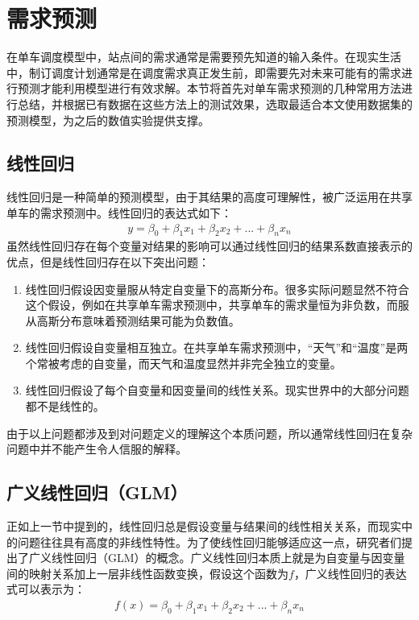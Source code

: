 \documentclass[]{tongjithesis}
\numberwithin{equation}{chapter}
\begin{document}
\clearpage

\chapter{需求预测}
在单车调度模型中，站点间的需求通常是需要预先知道的输入条件。在现实生活中，制订调度计划通常是在调度需求真正发生前，即需要先对未来可能有的需求进行预测才能利用模型进行有效求解。本节将首先对单车需求预测的几种常用方法进行总结，并根据已有数据在这些方法上的测试效果，选取最适合本文使用数据集的预测模型，为之后的数值实验提供支撑。
\section{线性回归}
线性回归是一种简单的预测模型，由于其结果的高度可理解性，被广泛运用在共享单车的需求预测中。线性回归的表达式如下：
\begin{align}
	y = \beta_{0}+\beta_{1}x_{1}+\beta_{2}x_{2}+...+\beta_{n}x_{n}
\end{align}
\noindent
虽然线性回归存在每个变量对结果的影响可以通过线性回归的结果系数直接表示的优点，但是线性回归存在以下突出问题：
\begin{enumerate}
	\item 线性回归假设因变量服从特定自变量下的高斯分布。很多实际问题显然不符合这个假设，例如在共享单车需求预测中，共享单车的需求量恒为非负数，而服从高斯分布意味着预测结果可能为负数值。
	\item 线性回归假设自变量相互独立。在共享单车需求预测中，“天气”和“温度”是两个常被考虑的自变量，而天气和温度显然并非完全独立的变量。
	\item 线性回归假设了每个自变量和因变量间的线性关系。现实世界中的大部分问题都不是线性的。
\end{enumerate}

由于以上问题都涉及到对问题定义的理解这个本质问题，所以通常线性回归在复杂问题中并不能产生令人信服的解释。

\section{广义线性回归（GLM）}
正如上一节中提到的，线性回归总是假设变量与结果间的线性相关关系，而现实中的问题往往具有高度的非线性特性。为了使线性回归能够适应这一点，研究者们提出了广义线性回归（GLM）的概念。广义线性回归本质上就是为自变量与因变量间的映射关系加上一层非线性函数变换，假设这个函数为$f$，广义线性回归的表达式可以表示为：
\begin{align}
	f(x) = \beta_{0}+\beta_{1}x_{1}+\beta_{2}x_{2}+...+\beta_{n}x_{n}
\end{align}
\end{document}
